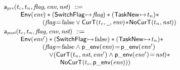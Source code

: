 \[
    \small
    \begin{array}{l}
        \apre(\ctid, \ntid, \flag, \env, \nst) \ \define \\
        \qquad
        \begin{array}{l}
            \Env{\env} \sepstar (\msto{\SwitchFlag}{\flag}) \sepstar (\msto{\TaskNew}{\ntid})
            \sepstar \\
            \hspace*{8ex}
            (\flag\! =\! \afalse
            \vee \CurTask{\ctid}{\notCare}{\env}
                \!*\! \NoCurTask{\ntid}{\nst})
        \end{array}
        \\
        \\[-9pt]
        \apost(\ctid, \ntid, \flag, \env, \nst) \ \define \\
        \qquad
        \begin{array}{l}
            \Env{\env'} \sepstar (\msto{\SwitchFlag}{\afalse})
                    \sepstar (\msto{\TaskNew}{\ntid}) \sepstar
            \\
            \hspace*{8ex}
            (
            \flag \!=\! \afalse \land \pEnv{\env} \!=\! \pEnv{\env'}
            \\
            \quad \hspace*{8ex}
            \vee (\CurTask{\ntid}{\nst}{\env'} \land \pEnv{\env'}\!=\!\nst) *
            \\
            \quad \hspace*{12ex}
            \NoCurTask{\ctid}{\pEnv{\env}})        
        \end{array}
    \end{array}
\]

